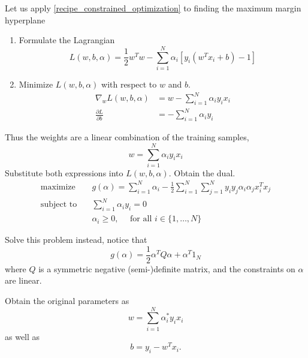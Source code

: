 \documentclass[12 pt]{article}        	%
\begin{document}
\begin{exmp}
    Let us apply \cref{recipe_constrained_optimization} to finding the maximum margin hyperplane
    \begin{enumerate}
        \item 
        Formulate the Lagrangian 
        \[
            L ( w , b , \alpha ) 
            = 
            \frac{ 1 }{ 2 }
            w^T w
            -
            \sum_{ i = 1 }^N \alpha_i [ y_i ( w^T x_i + b ) - 1 ]
        \]

        \item 
        Minimize $ L ( w , b , \alpha ) $ with respect to $ w $ and $ b $.
        \begin{align*}
            \nabla_w L ( w , b , \alpha ) 
            &=
            w - \sum_{ i = 1 }^N \alpha_i y_i x_i 
            \\
            \frac{ \partial L }{ \partial b }
            &=
            - \sum_{ i = 1 }^N \alpha_i y_i 
        \end{align*}
    \end{enumerate}

    Thus the weights are a linear combination of the training samples,
    \[
        w = \sum_{ i = 1 }^N \alpha_i y_i x_i
    \]
    Substitute both expressions into $ L ( w , b , \alpha ) $.
    Obtain the dual.
    \begin{align*}
        \text{maximize} \quad &g ( \alpha ) = \sum_{ i = 1 }^N \alpha_i 
        - 
        \frac{ 1 }{ 2 } \sum_{ i = 1 }^N \sum_{ j = 1 }^N y_i y_j \alpha_i \alpha_j x_i^T x_j 
        \\
        \text{subject to} \quad &\sum_{ i = 1}^N \alpha_i y_i = 0 
        \\
        &\alpha_i \geq 0 , \quad \text{ for all } i \in \{ 1 , \dotsc , N \}
    \end{align*}

    \item 
    Solve this problem instead, notice that 
    \[
        g ( \alpha ) 
        =
        \frac{ 1 }{ 2 } \alpha^T Q \alpha + \alpha^T 1_N
    \]
    where $ Q $ is a symmetric negative (semi-)definite matrix, and the constraints on $\alpha $ are linear.

    \item 
    Obtain the original parameters as 
    \[
        w = \sum_{ i = 1 }^N \alpha_i^* y_i x_i
    \]
    as well as
    \[
        b = y_i - w^T x_i.
    \]
\end{exmp}
\end{document}
